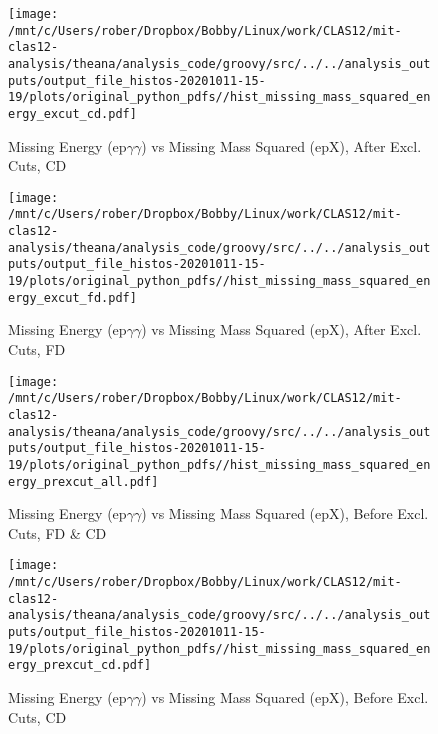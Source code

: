 \documentclass{article}
\begin{document}
\begin{landscape}
    \begin{figure}[h]
        \centering

        \texttt{[image: /mnt/c/Users/rober/Dropbox/Bobby/Linux/work/CLAS12/mit-clas12-analysis/theana/analysis\_code/groovy/src/../../analysis\_outputs/output\_file\_histos-20201011-15-19/plots/original\_python\_pdfs//hist\_missing\_mass\_squared\_energy\_excut\_cd.pdf]}
        \captionsetup{textformat=empty,labelformat=blank}
        \caption{Missing Energy (ep$\gamma$$\gamma$) vs Missing Mass Squared (epX), After Excl. Cuts, CD}
    \end{figure}
    \clearpage
    
    \begin{figure}[h]
        \centering

        \texttt{[image: /mnt/c/Users/rober/Dropbox/Bobby/Linux/work/CLAS12/mit-clas12-analysis/theana/analysis\_code/groovy/src/../../analysis\_outputs/output\_file\_histos-20201011-15-19/plots/original\_python\_pdfs//hist\_missing\_mass\_squared\_energy\_excut\_fd.pdf]}
        \captionsetup{textformat=empty,labelformat=blank}
        \caption{Missing Energy (ep$\gamma$$\gamma$) vs Missing Mass Squared (epX), After Excl. Cuts, FD}
    \end{figure}
    \clearpage
    
    \begin{figure}[h]
        \centering

        \texttt{[image: /mnt/c/Users/rober/Dropbox/Bobby/Linux/work/CLAS12/mit-clas12-analysis/theana/analysis\_code/groovy/src/../../analysis\_outputs/output\_file\_histos-20201011-15-19/plots/original\_python\_pdfs//hist\_missing\_mass\_squared\_energy\_prexcut\_all.pdf]}
        \captionsetup{textformat=empty,labelformat=blank}
        \caption{Missing Energy (ep$\gamma$$\gamma$) vs Missing Mass Squared (epX), Before Excl. Cuts, FD \& CD}
    \end{figure}
    \clearpage
    
    \begin{figure}[h]
        \centering

        \texttt{[image: /mnt/c/Users/rober/Dropbox/Bobby/Linux/work/CLAS12/mit-clas12-analysis/theana/analysis\_code/groovy/src/../../analysis\_outputs/output\_file\_histos-20201011-15-19/plots/original\_python\_pdfs//hist\_missing\_mass\_squared\_energy\_prexcut\_cd.pdf]}
        \captionsetup{textformat=empty,labelformat=blank}
        \caption{Missing Energy (ep$\gamma$$\gamma$) vs Missing Mass Squared (epX), Before Excl. Cuts, CD}
    \end{figure}
    \clearpage
    

\end{landscape}
\end{document}
